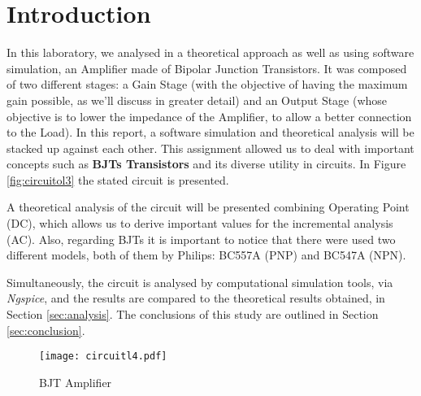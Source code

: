 \section{Introduction}
\label{sec:introduction}

In this laboratory, we analysed in a theoretical approach as well as using software simulation, an Amplifier made of Bipolar Junction Transistors.
It was composed of two different stages: a Gain Stage (with the objective of having the maximum gain possible, as we'll discuss in greater detail) and an Output Stage (whose objective is to lower the impedance of the Amplifier, to allow a better connection to the Load). In this report, a software simulation and theoretical analysis will be stacked up against each other. This assignment allowed us to deal with important concepts such as \textbf{BJTs Transistors} and its diverse utility in circuits. In Figure \ref{fig:circuitol3} the stated circuit is presented. 

A theoretical analysis of the circuit will be presented combining Operating Point (DC), which allows us to derive important values for the incremental analysis (AC). 
Also, regarding BJTs it is important to notice that there were used two different models, both of them by Philips: BC557A (PNP) and BC547A (NPN).  

Simultaneously, the circuit is analysed by computational simulation tools, via \textit{Ngspice}, and the results are compared to the theoretical results obtained, in Section \ref{sec:analysis}. The conclusions of this study are outlined in Section \ref{sec:conclusion}.

\begin{figure}[h] \centering
\texttt{[image: circuitl4.pdf]}
\caption{BJT Amplifier}
\label{fig:circuitol4}
\end{figure}

\clearpage
